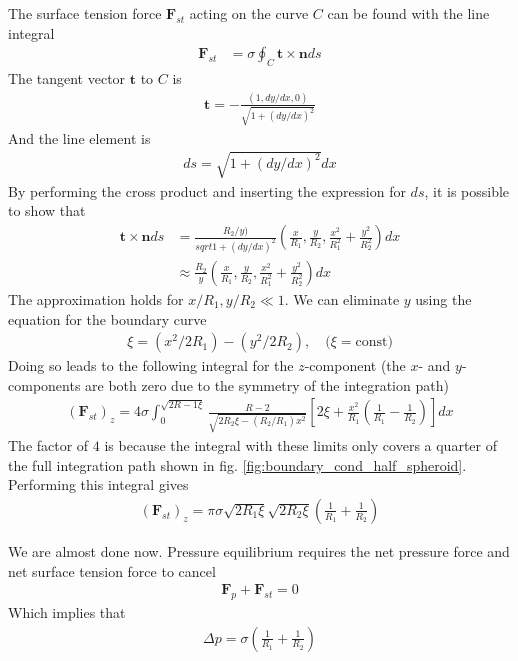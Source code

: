 \documentclass[a4paper, 12pt]{article}
\numberwithin{equation}{subsubsection}
\begin{document}
The surface tension force $\mathbf{F}_{st}$ acting on the curve $C$ can be found with the line integral
\begin{align}
	\mathbf{F}_{st} &= \sigma \oint_C \mathbf{t} \times \mathbf{n} ds
\end{align}
The tangent vector $\mathbf{t}$ to $C$ is
\begin{align}
	\mathbf{t} = - \frac{(1, dy/dx, 0)}{\sqrt{1 + (dy/dx)^2}}
\end{align}
And the line element is
\begin{align}
	ds = \sqrt{1 + (dy/dx)^2} dx
\end{align}
By performing the cross product and inserting the expression for $ds$, it is possible to show that
\begin{align}
	\mathbf{t} \times \mathbf{n} ds &= \frac{R_2/y)}{sqrt{1 + (dy/dx)^2}} \left(\frac{x}{R_1}, \frac{y}{R_2}, \frac{x^2}{R_1^2} + \frac{y^2}{R_2^2}\right) dx \\
	&\approx \frac{R_2}{y} \left(\frac{x}{R_1}, \frac{y}{R_2}, \frac{x^2}{R_1^2} + \frac{y^2}{R_2^2}\right) dx
\end{align}
The approximation holds for $x/R_1, y/R_2 \ll 1$. We can eliminate $y$ using the equation for the boundary curve
\begin{align}
	\xi = (x^2/2R_1) - (y^2/2R_2), \quad \text{($\xi = \text{const}$)}
\end{align}
Doing so leads to the following integral for the $z$-component (the $x$- and $y$-components are both zero due to the symmetry of the integration path)
\begin{align}
	(\mathbf{F}_{st})_z = 4 \sigma \int_0^{\sqrt{2R-1\xi}} \frac{R-2}{\sqrt{2R_2\xi - (R_2/R_1)x^2}} \left[2 \xi + \frac{x^2}{R_1} \left(\frac{1}{R_1} - \frac{1}{R_2} \right) \right] dx
\end{align}
The factor of $4$ is because the integral with these limits only covers a quarter of the full integration path shown in fig. \ref{fig:boundary_cond_half_spheroid}. Performing this integral gives
\begin{align}
	(\mathbf{F}_{st})_z = \pi \sigma \sqrt{2 R_1 \xi} \sqrt{2 R_2 \xi} \left(\frac{1}{R_1} + \frac{1}{R_2} \right)
\end{align}

We are almost done now. Pressure equilibrium requires the net pressure force and net surface tension force to cancel
\begin{align}
	\mathbf{F}_p + \mathbf{F}_{st} = 0
\end{align}
Which implies that
\begin{align}
	\Delta p = \sigma \left(\frac{1}{R_1} + \frac{1}{R_2} \right) \label{eq:boundary_cond_surface_tension_pressure_gradient}
\end{align}
\end{document}
